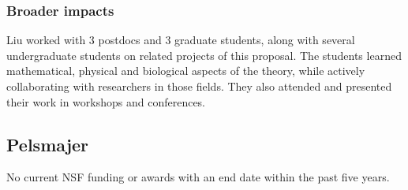\documentclass[11pt]{NSFamsart}
\begin{document}
\subsubsection*{Broader impacts}  Liu worked with
3 postdocs and 3 graduate students, along with several undergraduate students 
on related projects of this proposal. 
The students learned mathematical, physical and biological
aspects of the theory, while actively collaborating  with researchers in those fields.
They also attended and presented their work in workshops and conferences.


 
\subsection*{Pelsmajer} No current NSF funding or awards with an end date within the past five years. 

 





\newpage
{}
\renewcommand{\thepage} {\arabic{page}}


% 
%

\end{document}
